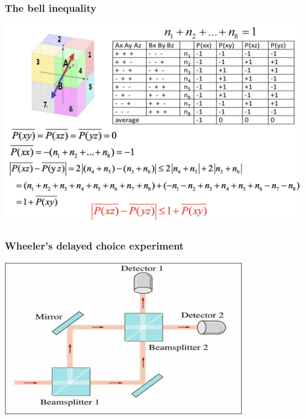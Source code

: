 \begin{frame}
    \frametitle{The bell inequality}
    \begin{center}
        \includegraphics[width=1.0\textwidth]{figs/bell.png} \\
    \end{center} 
\end{frame}

\begin{frame}
    \frametitle{Wheeler's delayed choice experiment}
    \begin{center}
        \includegraphics[width=0.8\textwidth]{figs/choose.png} \\
    \end{center} 
\end{frame}

